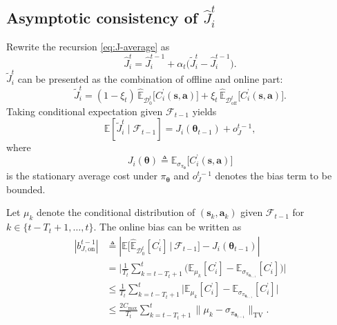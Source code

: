 \documentclass{IEEEtran}
\begin{document}
\subsection{Asymptotic consistency of $\hat{J}_i^t$}
Rewrite the recursion \eqref{eq:J-average} as
\begin{equation}
\hat{J}_i^{t}=\hat{J}_i^{t-1}+\alpha_t\big(\tilde{J}_i^{t}-\hat{J}_i^{t-1}\big).
\label{eq:appC_J_recursion}
\end{equation}
$\tilde{J}_i^{t}$ can be presented as the combination of offline and online part: 
\begin{equation}
\tilde{J}_i^{t}=(1-\xi_t)\,\hat{\mathbb{E}}_{\mathcal{D}_0^{t}}\big[C_i^{\text{'}}(\boldsymbol{s},\boldsymbol{a})\big]
+\xi_t\,\hat{\mathbb{E}}_{\mathcal{D}_{\mathrm{off}}^{t}}\big[C_i^{\text{'}}(\boldsymbol{s},\boldsymbol{a})\big].
\end{equation}
Taking conditional expectation given $\mathcal{F}_{t-1}$ yields
\begin{equation}
\mathbb{E}[\tilde{J}_i^{t}\mid\mathcal{F}_{t-1}]=J_i(\boldsymbol{\theta}_{t-1})+o_{J}^{t-1},
\label{eq:appC_J_cond_mean}
\end{equation}
where
\begin{equation}
J_i(\boldsymbol{\theta})\triangleq \mathbb{E}_{\sigma_{\pi_{\boldsymbol{\theta}}}}\big[C_i^{\text{'}}(\boldsymbol{s},\boldsymbol{a})\big]
\label{eq:appC_J_def}
\end{equation}
is the stationary average cost under $\pi_{\boldsymbol{\theta}}$ and $o_{J}^{t-1}$ denotes the bias term to be bounded. 

Let $\mu_k$ denote the conditional distribution of $(\boldsymbol{s}_k,\boldsymbol{a}_k)$ given $\mathcal{F}_{t-1}$ for $k\in\{t-T_t+1,\ldots,t\}$. 
The online bias can be written as
\begin{equation}
\begin{aligned}
 |b_{J,\mathrm{on}}^{t-1}|
 &\triangleq
 |\mathbb{E}\Big[\hat{\mathbb{E}}_{\mathcal{D}_0^{t}}[C_i^{\text{'}}]\,\Big|\,\mathcal{F}_{t-1}\Big]
 - J_i(\boldsymbol{\theta}_{t-1})| \\
 &= \bigg|
 \frac{1}{T_t}\sum_{k=t-T_t+1}^{t}
 \Big(\mathbb{E}_{\mu_k}[C_i^{\text{'}}]-\mathbb{E}_{\sigma_{\pi_{\boldsymbol{\theta}_{t-1}}}}[C_i^{\text{'}}]\Big)
 \bigg| \\
 &\le
 \frac{1}{T_t}\sum_{k=t-T_t+1}^{t}
 \Big|
 \mathbb{E}_{\mu_k}[C_i^{\text{'}}]-\mathbb{E}_{\sigma_{\pi_{\boldsymbol{\theta}_{t-1}}}}[C_i^{\text{'}}]
 \Big| \\
 &\le
 \frac{2C_{\max}}{T_t}\sum_{k=t-T_t+1}^{t}
 \big\|\mu_k-\sigma_{\pi_{\boldsymbol{\theta}_{t-1}}}\big\|_{\mathrm{TV}}.
\end{aligned}
\label{eq:appC_bJon_tv}
\end{equation}
\end{document}
